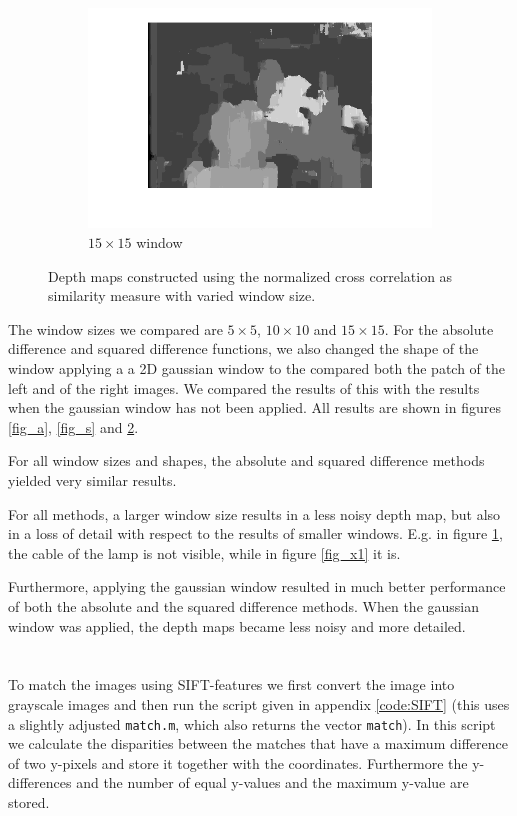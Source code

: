 \documentclass{article}
\begin{document}
\begin{figure}[ht!]
\begin{subfigure}{.3\textwidth}
  \centering
  \includegraphics[width=1\linewidth]{ex3/x15_15.png}
  \caption{$15\times15$ window}
  \label{fig_x3}
 \end{subfigure}
 \caption{Depth maps constructed using the normalized cross correlation as similarity measure with varied window size.}
 \label{fig_x}
\end{figure}

The window sizes we compared are $5\times5$, $10\times10$ and $15\times15$. For the absolute difference and squared difference functions, we also changed the shape of the window applying a a 2D gaussian window to the compared both the patch of the left and of the right images. We compared the results of this with the results when the gaussian window has not been applied. All results are shown in figures \ref{fig_a}, \ref{fig_s} and \ref{fig_x}.

For all window sizes and shapes, the absolute and squared difference methods yielded very similar results. 

For all methods, a larger window size results in a less noisy depth map, but also in a loss of detail with respect to the results of smaller windows. E.g. in figure \ref{fig_x3}, the cable of the lamp is not visible, while in figure \ref{fig_x1} it is.

Furthermore, applying the gaussian window resulted in much better performance of both the absolute and the squared difference methods. When the gaussian window was applied, the depth maps became less noisy and more detailed.

\section{}
To match the images using SIFT-features we first convert the image into grayscale images and then run the script given in appendix \ref{code:SIFT} (this uses a slightly adjusted \texttt{match.m}, which also returns the vector \texttt{match}). In this script we calculate the disparities between the matches that have a maximum difference of two y-pixels and store it together with the coordinates. Furthermore the y-differences and the number of equal y-values and the maximum y-value are stored.
\end{document}
